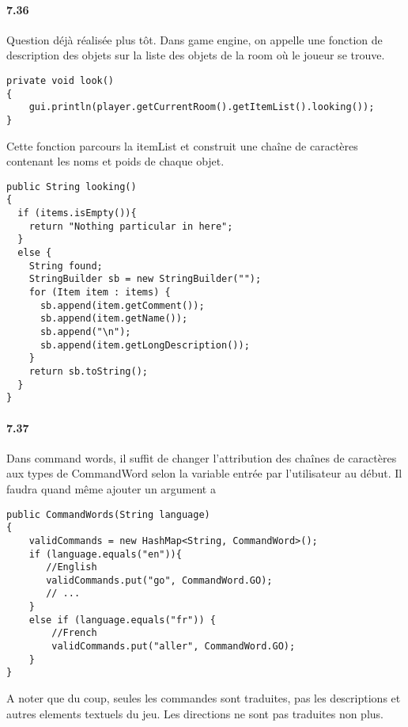 \documentclass[11pt,a4paper]{report}
\begin{document}
\paragraph{7.36}
Question déjà réalisée plus tôt. Dans game engine, on appelle une fonction de description des objets sur la liste des objets de la room où le joueur se trouve.
\begin{lstlisting}
private void look()
{
    gui.println(player.getCurrentRoom().getItemList().looking());
}
\end{lstlisting}
Cette fonction parcours la itemList et construit une chaîne de caractères contenant les noms et poids de chaque objet.
\begin{lstlisting}
public String looking()
{
  if (items.isEmpty()){
    return "Nothing particular in here";
  }
  else {
    String found;
    StringBuilder sb = new StringBuilder("");
    for (Item item : items) {
      sb.append(item.getComment());
      sb.append(item.getName());
      sb.append("\n");
      sb.append(item.getLongDescription());
    }
    return sb.toString();
  }
}
\end{lstlisting}

\paragraph{7.37}
Dans command words, il suffit de changer l'attribution des chaînes de caractères aux types de CommandWord selon la variable entrée par l'utilisateur au début. Il faudra quand même ajouter un argument a
\begin{lstlisting}
public CommandWords(String language)
{
    validCommands = new HashMap<String, CommandWord>();
    if (language.equals("en")){
       //English
       validCommands.put("go", CommandWord.GO);
	   // ...
    }
    else if (language.equals("fr")) {
        //French
        validCommands.put("aller", CommandWord.GO);
    }
}
\end{lstlisting}
A noter que du coup, seules les commandes sont traduites, pas les descriptions et autres elements textuels du jeu. Les directions ne sont pas traduites non plus.
\end{document}

